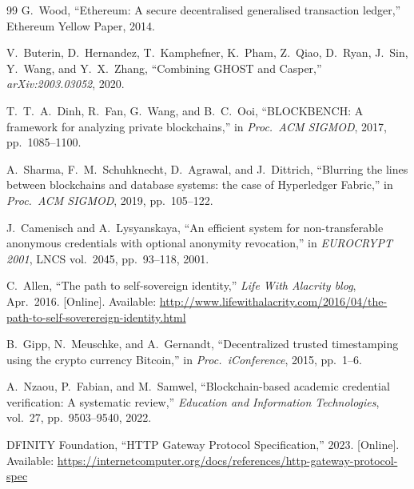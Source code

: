 \documentclass[journal]{IEEEtran}
\begin{document}
\begin{thebibliography}{99}
G.~Wood,
``Ethereum: A secure decentralised generalised transaction ledger,''
Ethereum Yellow Paper, 2014.

V.~Buterin, D.~Hernandez, T.~Kamphefner, K.~Pham, Z.~Qiao, D.~Ryan, J.~Sin, Y.~Wang, and Y.~X.~Zhang,
``Combining GHOST and Casper,''
\textit{arXiv:2003.03052}, 2020.

T.~T.~A.~Dinh, R.~Fan, G.~Wang, and B.~C.~Ooi,
``BLOCKBENCH: A framework for analyzing private blockchains,''
in \textit{Proc.\ ACM SIGMOD}, 2017, pp.~1085--1100.

A.~Sharma, F.~M.~Schuhknecht, D.~Agrawal, and J.~Dittrich,
``Blurring the lines between blockchains and database systems: the case of Hyperledger Fabric,''
in \textit{Proc.\ ACM SIGMOD}, 2019, pp.~105--122.

J.~Camenisch and A.~Lysyanskaya,
``An efficient system for non-transferable anonymous credentials with optional anonymity revocation,''
in \textit{EUROCRYPT 2001}, LNCS vol.~2045, pp.~93--118, 2001.

C.~Allen,
``The path to self-sovereign identity,''
\textit{Life With Alacrity blog}, Apr.~2016.
[Online]. Available: \url{http://www.lifewithalacrity.com/2016/04/the-path-to-self-soverereign-identity.html}

B.~Gipp, N.~Meuschke, and A.~Gernandt,
``Decentralized trusted timestamping using the crypto currency Bitcoin,''
in \textit{Proc.\ iConference}, 2015, pp.~1--6.

A.~Nzaou, P.~Fabian, and M.~Samwel,
``Blockchain-based academic credential verification: A systematic review,''
\textit{Education and Information Technologies}, vol.~27, pp.~9503--9540, 2022.

DFINITY Foundation,
``HTTP Gateway Protocol Specification,''
2023.
[Online]. Available: \url{https://internetcomputer.org/docs/references/http-gateway-protocol-spec}

\end{thebibliography}
\end{document}
